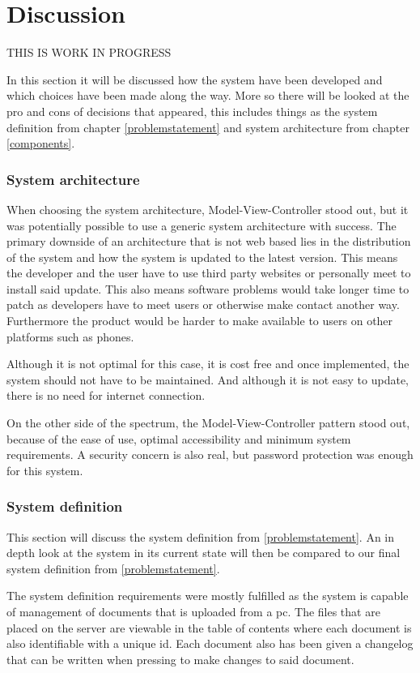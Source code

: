 \chapter{Discussion}
THIS IS WORK IN PROGRESS

In this section it will be discussed how the system have been developed and which choices have been made along the way. More so there will be looked at the pro and cons of decisions that appeared, this includes things as the system definition from chapter \cref{problemstatement} and system architecture from chapter \cref{components}.

\subsection{System architecture}
When choosing the system architecture, Model-View-Controller stood out, but it was potentially possible to use a generic system architecture with success. The primary downside of an architecture that is not web based lies in the distribution of the system and how the system is updated to the latest version. This means the developer and the user have to use third party websites or personally meet to install said update. This also means software problems would take longer time to patch as developers have to meet users or otherwise make contact another way. Furthermore the product would be harder to make available to users on other platforms such as phones.

Although it is not optimal for this case, it is cost free and once implemented, the system should not have to be maintained. And although it is not easy to update, there is no need for internet connection.

On the other side of the spectrum, the Model-View-Controller pattern stood out, because of the ease of use, optimal accessibility and minimum system requirements. A security concern is also real, but password protection was enough for this system.

\subsection{System definition}
This section will discuss the system definition from \cref{problemstatement}. An in depth look at the system in its current state will then be compared to our final system definition from \cref{problemstatement}.

The system definition requirements were mostly fulfilled as the system is capable of management of documents that is uploaded from a pc. The files that are placed on the server are viewable in the table of contents where each document is also identifiable with a unique id. Each document also has been given a changelog that can be written when pressing to make changes to said document. 

